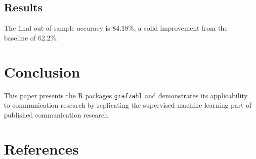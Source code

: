 \documentclass[
  english,
  man,floatsintext]{apa7}
\begin{document}
\hypertarget{results}{%
\subsection{Results}\label{results}}

The final out-of-sample accuracy is 84.18\%, a solid improvement from the baseline of 62.2\%.

\hypertarget{conclusion}{%
\section{Conclusion}\label{conclusion}}

This paper presents the R packages \texttt{grafzahl} and demonstrates its applicability to communication research by replicating the supervised machine learning part of published communication research.

\hypertarget{references}{%
\section{References}\label{references}}

\begingroup
\setlength{\parindent}{-0.5in}
\setlength{\leftskip}{0.5in}
\end{document}
